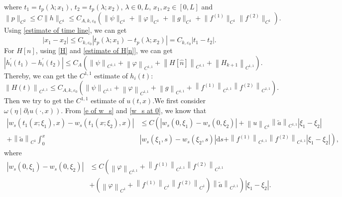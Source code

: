 \documentclass[a4paper,reqno,11pt]{amsart}
\numberwithin{equation}{section} %
\begin{document}
where $t_1=t_p(\lambda ;x _1)$, $t_2=t_p(\lambda;x _2)$, $\lambda  \in { 0,L } $, $x _1,x _2 \in [0,L]$  and
$$
\|p\|_{C^2} \leq C\|h\|_{C^1} \leq C_{A,k,\varepsilon _0}(\lVert \psi \rVert _{C^1}+\lVert \varphi  \rVert _{C^1}+  \lVert g \rVert _{C^1}+\lVert f^{(1)} \rVert _{C^1}\lVert f^{(2)} \rVert _{C^1}) .
$$
Using \eqref{estimate of time line}, we can get
$$
\left| x_1-x_2 \right|\le C_{k,\varepsilon _0}\left| t_p\left( \lambda ;x_1 \right) -t_p\left( \lambda ;x_2 \right) \right|=C_{k,\varepsilon _0}\left| t_1-t_2 \right|.
$$
For $ H\left[ n \right] $, using \eqref{H} and \eqref{estimate of H[n]}, we can get
$$
\left| h^{\prime }_i\left( t_1 \right) -h^{\prime }_i\left( t_2 \right) \right|\leq C_A(\left\| \psi \right\| _{C^{1,1}}+\left\| \varphi \right\| _{C^{1,1}}+ \left\|H\left[ \hat{n} \right] \right\| _{C^{1,1}}+\left\|H_{k+1}\right\| _{C^{1,1}}).
$$
Thereby, we can get the $C^{1,1}$ estimate of $h_i(t) $:
$$
\left\| H(t) \right\| _{C^{1,1}}\leq C_{A,k,\varepsilon _0}(\left\| \psi \right\| _{C^{1,1}}+\left\| \varphi \right\| _{C^{1,1}}+\left\| g \right\| _{C^{1,1}}+\left\| f^{(1)} \right\| _{C^{1,1}}\left\| f^{(2)} \right\| _{C^{1,1}}).
$$
Then we try to get the $C^{1,1}$ estimate of $ u(t,x)$.We first consider $\omega \left( \eta \mid \partial _tu(\cdot ,x) \right) $.
From \eqref{e of w_s} and \eqref{w_s at 0}, we know that
$$
\begin{aligned}
\left| w_s\left( t_1\left( x;\xi _1 \right) ,x \right) -w_s\left( t_1\left( x;\xi _2 \right) ,x \right) \right| & \leq C\left( \left| w_s\left( 0,\xi _1 \right) -w_s\left( 0,\xi _2 \right) \right|+\left\| u \right\| _{C^1}\left\| \tilde{a} \right\| _{C^{1,1}}\left| \xi _1-\xi _2 \right| \right. \\
+\left\| \tilde{a} \right\| _{C^1}\int_0^x & {\left| w_s\left( \xi _1,s \right) -w_s\left( \xi _2,s \right) \right|\mathrm{d}s}  \left. +\left\| f^{\left( 1 \right)} \right\| _{C^{1,1}}\left\| f^{\left( 2 \right)} \right\| _{C^{1,1}}\left| \xi _1-\xi _2 \right| \right) ,
\end{aligned}
$$
where
$$
\begin{aligned}
	\left| w_s\left( 0,\xi _1 \right) -w_s\left( 0,\xi _2 \right) \right|& \leq  C\left( \left\| \varphi \right\| _{C^{1,1}}+\left\| f^{(1)} \right\| _{C^{1,1}}\left\| f^{(2)} \right\| _{C^{1,1}} \right.\\
	& \left. +\left( \left\| \varphi \right\| _{C^1}+\left\| f^{(1)} \right\| _{C^1}\left\| f^{(2)} \right\| _{C^1} \right) \left\| \tilde{a} \right\| _{C^{1,1}} \right) \left| \xi _1-\xi _2 \right|.
\end{aligned}
$$
\end{document}
